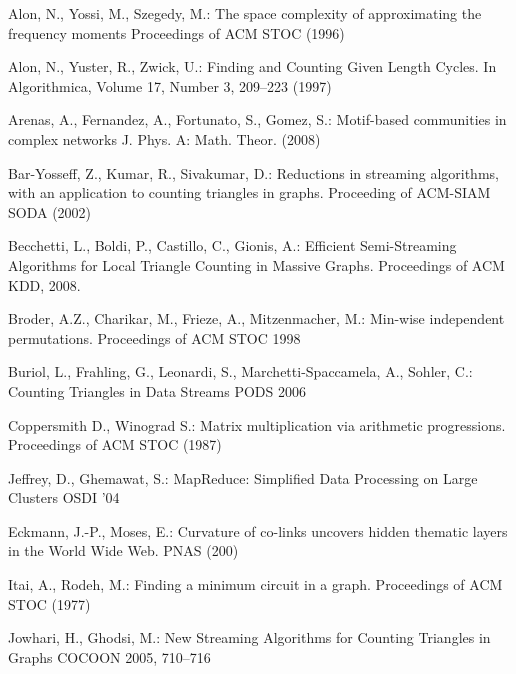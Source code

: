 \documentclass{llncs}
\begin{document}
\begin{thebibliography}{5}


Alon, N., Yossi, M., Szegedy, M.:
The space complexity of approximating the frequency moments
Proceedings of ACM STOC (1996)

Alon, N., Yuster, R., Zwick, U.:
Finding and Counting Given Length Cycles.
In Algorithmica, Volume 17, Number 3, 209--223 (1997)

Arenas, A., Fernandez, A., Fortunato, S., Gomez, S.:
Motif-based communities in complex networks
J. Phys. A: Math. Theor. (2008)


Bar-Yosseff, Z., Kumar, R., Sivakumar, D.:
Reductions in streaming algorithms, with an application to counting triangles in graphs.
Proceeding of ACM-SIAM SODA (2002)

Becchetti, L., Boldi, P., Castillo, C.,  Gionis, A.:
Efficient Semi-Streaming Algorithms for Local Triangle Counting in Massive Graphs.
Proceedings of ACM KDD, 2008.

Broder, A.Z., Charikar, M., Frieze, A., Mitzenmacher, M.:
Min-wise independent permutations.
Proceedings of ACM STOC 1998

Buriol, L., Frahling, G., Leonardi, S.,  Marchetti-Spaccamela, A., Sohler, C.:
Counting Triangles in Data Streams
PODS 2006



Coppersmith D., Winograd S.:
Matrix multiplication via arithmetic progressions.
Proceedings of ACM STOC (1987)

Jeffrey, D., Ghemawat, S.:
MapReduce: Simplified Data Processing on Large Clusters
OSDI '04

Eckmann, J.-P., Moses, E.:
Curvature of co-links uncovers hidden thematic layers in the World Wide Web.
PNAS (200)












Itai, A., Rodeh, M.:
Finding a minimum circuit in a graph.
Proceedings of ACM STOC (1977)



Jowhari, H., Ghodsi, M.:
New Streaming Algorithms for Counting Triangles in Graphs
COCOON 2005, 710--716


\end{thebibliography}
\end{document}
